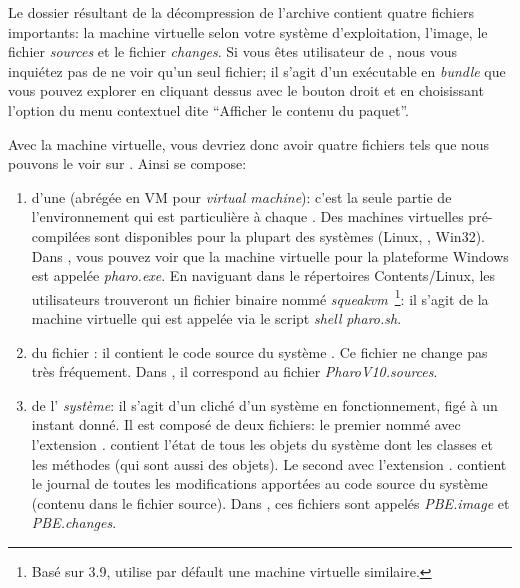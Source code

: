 \documentclass[a4paper,10pt,twoside]{book}
\begin{document}

Le dossier résultant de la décompression de l'archive contient quatre fichiers importants: la machine virtuelle selon votre système d'exploitation, l'image, le fichier \emph{sources} et le fichier \emph{changes}. Si vous êtes utilisateur de \macosx, nous vous inquiétez pas de ne voir qu'un seul fichier; il s'agit d'un exécutable en \emph{bundle} que vous pouvez explorer en cliquant dessus avec le bouton droit et en choisissant l'option du menu contextuel dite ``Afficher le contenu du paquet''.

Avec la machine virtuelle, vous devriez donc avoir quatre fichiers tels que nous pouvons le voir sur . Ainsi \pharo{} se compose:

\begin{enumerate}
\item d'une  (abrégée en VM pour
  \emph{virtual machine}): c'est la seule partie de l'environnement qui
  est particulière à chaque . Des machines virtuelles pré-compilées sont disponibles pour la plupart des
  systèmes (Linux, \macosx, Win32). Dans , vous
pouvez voir que la machine virtuelle pour la plateforme Windows est
appelée \textit{pharo.exe}. En naviguant dans le répertoires \textsf{Contents/Linux}, les utilisateurs
trouveront un fichier binaire nommé \textit{squeakvm}~\footnote{Basé sur \squeak{}3.9, \pharo utilise par défault une machine virtuelle similaire.}: il s'agit de la machine virtuelle qui est appelée via le script \emph{shell} \textit{pharo.sh}.

  \item du fichier : il contient le code source du système
    \pharo. Ce fichier ne change pas très fréquement. Dans , il
    correspond au fichier
    \emph{PharoV10.sources}.

\item de l' \emph{système}: il s'agit d'un cliché d'un système
  \pharo{} en fonctionnement, figé à un instant donné. 
Il est composé de deux fichiers: le premier nommé avec l'extension
\emph{.} contient l'état de tous les objets du système
dont les classes et les méthodes (qui sont aussi des objets). 
Le second avec l'extension \emph{.} contient
le journal de toutes les modifications apportées au code source du
système (contenu dans le fichier source).
Dans , ces fichiers sont appelés
  \emph{PBE.image} et \emph{PBE.changes}.
\end{enumerate}
\end{document}
